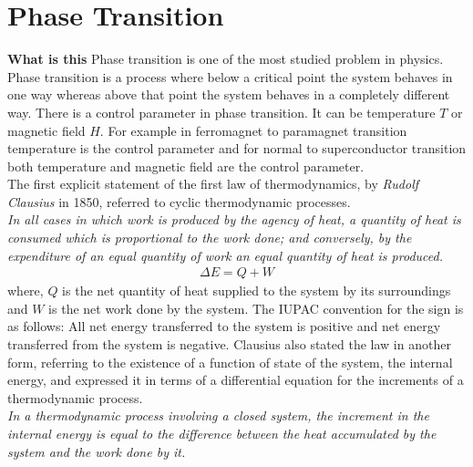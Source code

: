 \chapter{Phase Transition}

\ifpdf
    \graphicspath{{Chapter3/Figs/thermodynamics/}{Chapter3/Figs/}}
\else
    \graphicspath{{Chapter3/Figs/thermodynamics/}{Chapter3/Figs/}}
\fi

\textbf{What is this}
Phase transition is one of the most studied problem in physics. Phase transition is a process where below a critical point the system behaves in one way whereas above that point the system behaves in a completely different way. There is a control parameter in phase transition. It can be temperature $T$ or magnetic field $H$. For example in ferromagnet to paramagnet transition temperature is the control parameter and for normal to superconductor transition both temperature and magnetic field are the control parameter.\\
The first explicit statement of the first law of thermodynamics, by \textit{Rudolf Clausius} in 1850, referred to cyclic thermodynamic processes. \\
\textit{In all cases in which work is produced by the agency of heat, a quantity of heat is consumed which is proportional to the work done; and conversely, by the expenditure of an equal quantity of work an equal quantity of heat is produced.}\\
\begin{align}
	\Delta E = Q + W
\end{align}
where, $Q$ is the net quantity of heat supplied to the system by its surroundings and $W$ is the net work done by the system.
The IUPAC convention for the sign is as follows: All net energy transferred to the system is positive and net energy transferred from the system is negative.
Clausius also stated the law in another form, referring to the existence of a function of state of the system, the internal energy, and expressed it in terms of a differential equation for the increments of a thermodynamic process.\\
\textit{In a thermodynamic process involving a closed system, the increment in the internal energy is equal to the difference between the heat accumulated by the system and the work done by it.}\\
